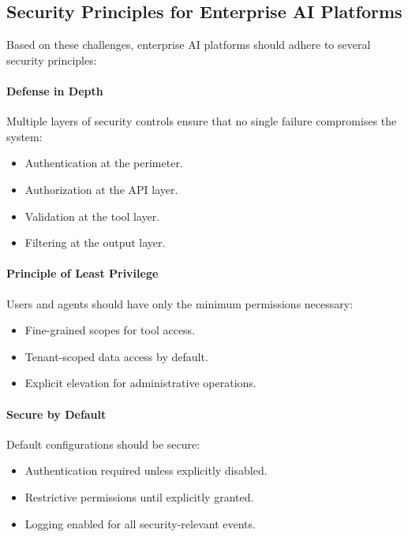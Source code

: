 \subsection{Security Principles for Enterprise AI Platforms}

Based on these challenges, enterprise AI platforms should adhere to several security principles:

\paragraph{Defense in Depth}

Multiple layers of security controls ensure that no single failure compromises the system:
\begin{itemize}
    \item Authentication at the perimeter.
    \item Authorization at the API layer.
    \item Validation at the tool layer.
    \item Filtering at the output layer.
\end{itemize}

\paragraph{Principle of Least Privilege}

Users and agents should have only the minimum permissions necessary:
\begin{itemize}
    \item Fine-grained scopes for tool access.
    \item Tenant-scoped data access by default.
    \item Explicit elevation for administrative operations.
\end{itemize}

\paragraph{Secure by Default}

Default configurations should be secure:
\begin{itemize}
    \item Authentication required unless explicitly disabled.
    \item Restrictive permissions until explicitly granted.
    \item Logging enabled for all security-relevant events.
\end{itemize}

